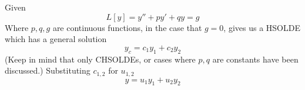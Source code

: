 \documentclass[diffeq.tex]{subfiles}
\begin{document}
    \begin{bproof}
        Given
        \begin{equation}
            L[y] = y'' + py' + qy = g
        \end{equation}
        Where $p,q,g$ are continuous functions, in the case that $g = 0$, gives us a HSOLDE which has a general solution
        \begin{equation}
            y_{c} = c_{1}y_{1} + c_{2}y_{2}
        \end{equation}
        (Keep in mind that only CHSOLDEs, or cases where $p, q$ are constants have been discussed.)
        Substituting $c_{1,2}$ for $u_{1,2}$
        \begin{equation}
            y = u_{1}y_{1} + u_{2}y_{2}
        \end{equation}
    \end{bproof}
\end{document}
